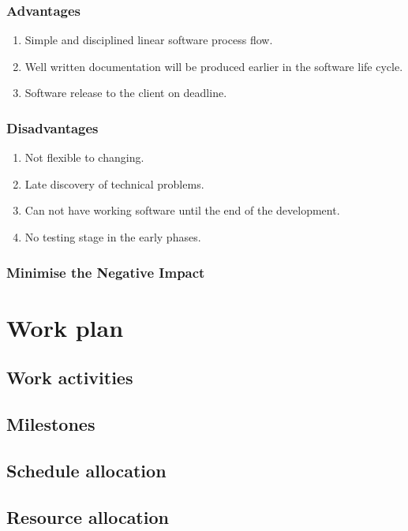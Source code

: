 \documentclass[11pt, a4paper]{report}
\begin{document}
\subsection{Advantages}
\begin{enumerate}
	\item  Simple and disciplined linear software process flow.
	\item  Well written documentation will be produced earlier in the software life cycle.
	\item  Software release to the client on deadline.
\end{enumerate}

\subsection{Disadvantages}
\begin{enumerate}
	\item  Not flexible to changing.
	\item  Late discovery of technical problems.
	\item  Can not have working software until the end of the development.
	\item  No testing stage in the early phases.
\end{enumerate}

\subsection{Minimise the Negative Impact}


\chapter{Work plan}



\section{Work activities}



\section{Milestones}

\section{Schedule allocation}

\section{Resource allocation}
\end{document}
